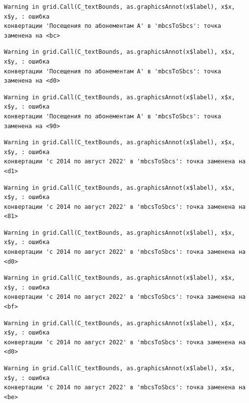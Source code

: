 \documentclass[
  letterpaper,
  DIV=11,
  numbers=noendperiod]{scrreprt}
\begin{document}
\begin{verbatim}
Warning in grid.Call(C_textBounds, as.graphicsAnnot(x$label), x$x, x$y, : ошибка
конвертации 'Посещения по абонементам А' в 'mbcsToSbcs': точка заменена на <bc>
\end{verbatim}

\begin{verbatim}
Warning in grid.Call(C_textBounds, as.graphicsAnnot(x$label), x$x, x$y, : ошибка
конвертации 'Посещения по абонементам А' в 'mbcsToSbcs': точка заменена на <d0>
\end{verbatim}

\begin{verbatim}
Warning in grid.Call(C_textBounds, as.graphicsAnnot(x$label), x$x, x$y, : ошибка
конвертации 'Посещения по абонементам А' в 'mbcsToSbcs': точка заменена на <90>
\end{verbatim}

\begin{verbatim}
Warning in grid.Call(C_textBounds, as.graphicsAnnot(x$label), x$x, x$y, : ошибка
конвертации 'с 2014 по август 2022' в 'mbcsToSbcs': точка заменена на <d1>
\end{verbatim}

\begin{verbatim}
Warning in grid.Call(C_textBounds, as.graphicsAnnot(x$label), x$x, x$y, : ошибка
конвертации 'с 2014 по август 2022' в 'mbcsToSbcs': точка заменена на <81>
\end{verbatim}

\begin{verbatim}
Warning in grid.Call(C_textBounds, as.graphicsAnnot(x$label), x$x, x$y, : ошибка
конвертации 'с 2014 по август 2022' в 'mbcsToSbcs': точка заменена на <d0>
\end{verbatim}

\begin{verbatim}
Warning in grid.Call(C_textBounds, as.graphicsAnnot(x$label), x$x, x$y, : ошибка
конвертации 'с 2014 по август 2022' в 'mbcsToSbcs': точка заменена на <bf>
\end{verbatim}

\begin{verbatim}
Warning in grid.Call(C_textBounds, as.graphicsAnnot(x$label), x$x, x$y, : ошибка
конвертации 'с 2014 по август 2022' в 'mbcsToSbcs': точка заменена на <d0>
\end{verbatim}

\begin{verbatim}
Warning in grid.Call(C_textBounds, as.graphicsAnnot(x$label), x$x, x$y, : ошибка
конвертации 'с 2014 по август 2022' в 'mbcsToSbcs': точка заменена на <be>
\end{verbatim}
\end{document}
